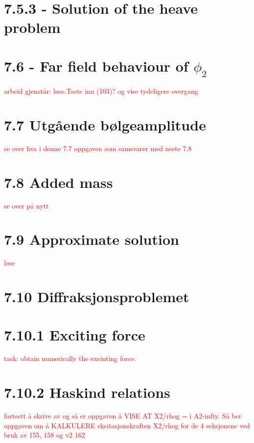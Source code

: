 \documentclass{article}
\begin{document}
\section{7.5.3 - Solution of the heave problem}


\section{7.6 - Far field behaviour of $\phi_2$}

\textcolor{red}{arbeid gjenstår: løse.Taste inn (103)? og vise tydeligere overgang}

\section{7.7 Utgående bølgeamplitude}

\textcolor{red}{se over hva i denne 7.7 oppgaven som samsvarer med neste 7.8}

\section{7.8 Added mass}

\textcolor{red}{se over på nytt}

\section{7.9 Approximate solution}

\textcolor{red}{løse}
 
 
\section{7.10 Diffraksjonsproblemet}
%

\section{7.10.1 Exciting force}
%
\textcolor{red}{task: obtain numerically the excinting force. }

\section{7.10.2 Haskind relations}
%
\textcolor{red}{fortsett å skrive av og så er oppgaven å VISE AT X2/rhog = i A2-infty. Så ber oppgaven om å KALKULERE eksitasjonskraften X2/rhog  for de 4 seksjonene ved bruk av 155, 158 og v2 162}
\end{document}
